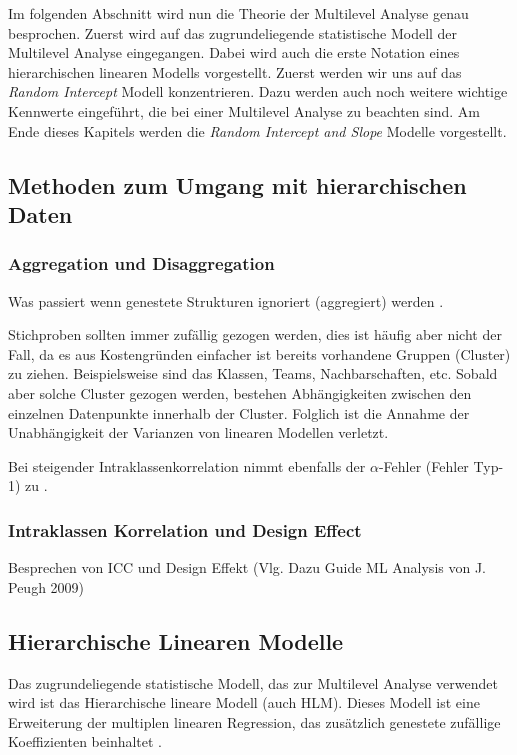 \documentclass[12pt]{article}\usepackage[]{graphicx}\usepackage[]{color}
\begin{document}
Im folgenden Abschnitt wird nun die Theorie der Multilevel Analyse genau besprochen. Zuerst wird auf das zugrundeliegende statistische Modell der Multilevel Analyse eingegangen. Dabei wird auch die erste Notation eines hierarchischen linearen Modells vorgestellt. Zuerst werden wir uns auf das \textit{Random Intercept} Modell konzentrieren. Dazu werden auch noch weitere wichtige Kennwerte eingeführt, die bei einer Multilevel Analyse zu beachten sind. Am Ende dieses Kapitels werden die  \textit{Random Intercept and Slope} Modelle vorgestellt.

\subsection{Methoden zum Umgang mit hierarchischen Daten}

\subsubsection{Aggregation und Disaggregation}
Was passiert wenn genestete Strukturen ignoriert (aggregiert) werden \cite{SnijdersTomA.B2012Ma:a}.

Stichproben sollten immer zufällig gezogen werden, dies ist häufig aber nicht der Fall, da es aus Kostengründen einfacher ist bereits vorhandene Gruppen (Cluster) zu ziehen. Beispielsweise sind das Klassen, Teams, Nachbarschaften, etc. Sobald aber solche Cluster gezogen werden, bestehen Abhängigkeiten zwischen den einzelnen Datenpunkte innerhalb der Cluster. Folglich ist die Annahme der Unabhängigkeit der Varianzen von linearen Modellen verletzt.

Bei steigender Intraklassenkorrelation nimmt ebenfalls der $\alpha$-Fehler (Fehler Typ-1) zu \cite{dorman2008effect}.

\subsubsection{Intraklassen Korrelation und Design Effect}
Besprechen von ICC und Design Effekt (Vlg. Dazu Guide ML Analysis von J. Peugh 2009)


\subsection{Hierarchische Linearen Modelle}
Das zugrundeliegende statistische Modell, das zur Multilevel Analyse verwendet wird ist das Hierarchische lineare Modell (auch HLM). Dieses Modell ist eine Erweiterung der multiplen linearen Regression, das zusätzlich genestete zufällige Koeffizienten beinhaltet \cite{SnijdersTomA.B2012Ma:a}.
\end{document}
